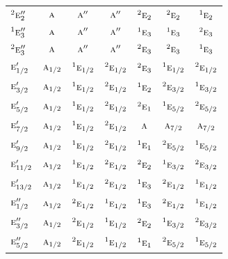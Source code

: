 \documentclass[10pt,a4paper]{article}
\numberwithin{equation}{section}
\newcommand{\irr}[1]{\text{\normalfont\scshape #1}}
\newcommand{\conjpair}[1]{{}^{#1}}
\begin{document}
{\begin{longtable}{@{}lcccccc@{}}
$\conjpair{2}\irr{e}_{2}''$ & $\irr{a}$ & $\irr{a}''$ & $\irr{a}''$ & $\conjpair{2}\irr{e}_{2}$ & $\conjpair{2}\irr{e}_{2}$ & $\conjpair{1}\irr{e}_{2}$\\
$\conjpair{1}\irr{e}_{3}''$ & $\irr{a}$ & $\irr{a}''$ & $\irr{a}''$ & $\conjpair{1}\irr{e}_{3}$ & $\conjpair{1}\irr{e}_{3}$ & $\conjpair{2}\irr{e}_{3}$\\
$\conjpair{2}\irr{e}_{3}''$ & $\irr{a}$ & $\irr{a}''$ & $\irr{a}''$ & $\conjpair{2}\irr{e}_{3}$ & $\conjpair{2}\irr{e}_{3}$ & $\conjpair{1}\irr{e}_{3}$\\
$\irr{e}_{1/2}'$ & $\irr{a}_{1/2}$ & $\conjpair{1}\irr{e}_{1/2}$ & $\conjpair{2}\irr{e}_{1/2}$ & $\conjpair{2}\irr{e}_{3}$ & $\conjpair{1}\irr{e}_{1/2}$ & $\conjpair{2}\irr{e}_{1/2}$\\
$\irr{e}_{3/2}'$ & $\irr{a}_{1/2}$ & $\conjpair{1}\irr{e}_{1/2}$ & $\conjpair{2}\irr{e}_{1/2}$ & $\conjpair{1}\irr{e}_{2}$ & $\conjpair{2}\irr{e}_{3/2}$ & $\conjpair{1}\irr{e}_{3/2}$\\
$\irr{e}_{5/2}'$ & $\irr{a}_{1/2}$ & $\conjpair{1}\irr{e}_{1/2}$ & $\conjpair{2}\irr{e}_{1/2}$ & $\conjpair{2}\irr{e}_{1}$ & $\conjpair{1}\irr{e}_{5/2}$ & $\conjpair{2}\irr{e}_{5/2}$\\
$\irr{e}_{7/2}'$ & $\irr{a}_{1/2}$ & $\conjpair{1}\irr{e}_{1/2}$ & $\conjpair{2}\irr{e}_{1/2}$ & $\irr{a}$ & $\irr{a}_{7/2}$ & $\irr{a}_{7/2}$\\
$\irr{e}_{9/2}'$ & $\irr{a}_{1/2}$ & $\conjpair{1}\irr{e}_{1/2}$ & $\conjpair{2}\irr{e}_{1/2}$ & $\conjpair{1}\irr{e}_{1}$ & $\conjpair{2}\irr{e}_{5/2}$ & $\conjpair{1}\irr{e}_{5/2}$\\
$\irr{e}_{11/2}'$ & $\irr{a}_{1/2}$ & $\conjpair{1}\irr{e}_{1/2}$ & $\conjpair{2}\irr{e}_{1/2}$ & $\conjpair{2}\irr{e}_{2}$ & $\conjpair{1}\irr{e}_{3/2}$ & $\conjpair{2}\irr{e}_{3/2}$\\
$\irr{e}_{13/2}'$ & $\irr{a}_{1/2}$ & $\conjpair{1}\irr{e}_{1/2}$ & $\conjpair{2}\irr{e}_{1/2}$ & $\conjpair{1}\irr{e}_{3}$ & $\conjpair{2}\irr{e}_{1/2}$ & $\conjpair{1}\irr{e}_{1/2}$\\
$\irr{e}_{1/2}''$ & $\irr{a}_{1/2}$ & $\conjpair{2}\irr{e}_{1/2}$ & $\conjpair{1}\irr{e}_{1/2}$ & $\conjpair{1}\irr{e}_{3}$ & $\conjpair{2}\irr{e}_{1/2}$ & $\conjpair{1}\irr{e}_{1/2}$\\
$\irr{e}_{3/2}''$ & $\irr{a}_{1/2}$ & $\conjpair{2}\irr{e}_{1/2}$ & $\conjpair{1}\irr{e}_{1/2}$ & $\conjpair{2}\irr{e}_{2}$ & $\conjpair{1}\irr{e}_{3/2}$ & $\conjpair{2}\irr{e}_{3/2}$\\
$\irr{e}_{5/2}''$ & $\irr{a}_{1/2}$ & $\conjpair{2}\irr{e}_{1/2}$ & $\conjpair{1}\irr{e}_{1/2}$ & $\conjpair{1}\irr{e}_{1}$ & $\conjpair{2}\irr{e}_{5/2}$ & $\conjpair{1}\irr{e}_{5/2}$\\

\end{longtable}}
\end{document}
